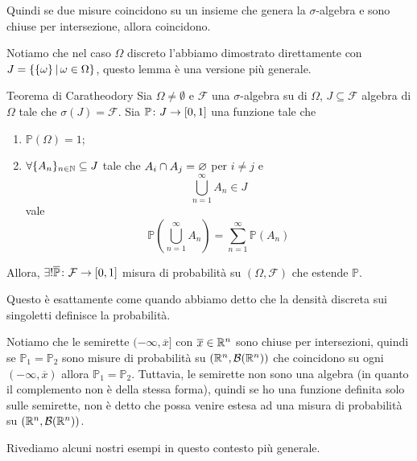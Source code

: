 \documentclass[a4paper]{article}
\begin{document}
Quindi se due misure coincidono su un insieme che genera la \(\sigma\)-algebra
e sono chiuse per intersezione, allora coincidono.

Notiamo che nel caso \(\Omega\) discreto l'abbiamo dimostrato direttamente con
\(J = \{\{\omega\} \,|\, \omega \in \Omega\}\), questo lemma è una versione più generale.

\begin{snippettheorem}{Teorema di Caratheodory}
    Sia \(\Omega \neq \emptyset\)
    e \(\mathcal F\) una \(\sigma\)-algebra su di \(\Omega\),
    \(J \subseteq \mathcal F\) algebra di \(\Omega\)
    tale che \(\sigma(J) = \mathcal F\).
    Sia \(\mathbb P \colon J \to [0,1]\) una funzione tale che
    \begin{enumerate}
        \item \(\mathbb P(\Omega) = 1\);
        \item \(\forall \{A_n\}_{n \in \mathbb{N}} \subseteq J\) tale che
            \(A_i \cap A_j = \varnothing\) per \(i \neq j\) e \[
                \bigcup_{n=1}^\infty A_n \in J
            \]
            vale \[
                \mathbb P\left(
                    \bigcup_{n=1}^\infty A_n
                \right)
                = \sum_{n=1}^\infty \mathbb P(A_n)
            \]
    \end{enumerate}
    Allora, \(\exists ! \overline {\mathbb P} \colon \mathcal F \to [0,1]\)
    misura di probabilità su \((\Omega, \mathcal F)\)
    che estende \(\mathbb P\).
\end{snippettheorem}

Questo è esattamente come quando abbiamo detto che
la densità discreta sui singoletti definisce la probabilità.

Notiamo che le semirette \((-\infty, \overline x]\)
con \(\overline x \in \mathbb{R}^n\) sono chiuse per intersezioni,
quindi se \(\mathbb P_1 = \mathbb P_2\)
sono misure di probabilità su
\((\mathbb{R}^n, \mathcal B(\mathbb{R}^n))\)
che coincidono su ogni \((-\infty, \overline x)\) allora
\(\mathbb P_1 = \mathbb P_2\). Tuttavia, le semirette non sono una algebra
(in quanto il complemento non è della stessa forma),
quindi se ho una funzione definita solo sulle semirette, non è detto che possa venire estesa
ad una misura di probabilità su
\((\mathbb{R}^n, \mathcal B(\mathbb{R}^n))\).

Rivediamo alcuni nostri esempi in questo contesto
più generale.
\end{document}
